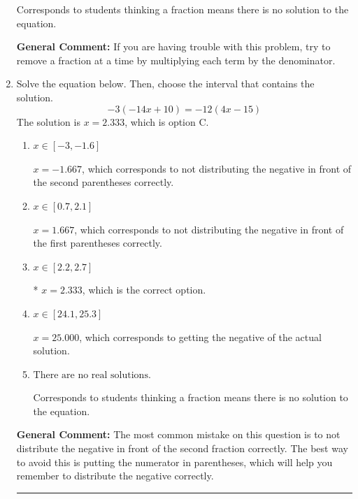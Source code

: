 \documentclass{extbook}[14pt]
\newcommand{\litem}[1]{\item #1

\rule{\textwidth}{0.4pt}}
\begin{document}
\begin{enumerate}
{\begin{enumerate}[label=\Alph*.]
Corresponds to students thinking a fraction means there is no solution to the equation.
\end{enumerate}

\textbf{General Comment:} If you are having trouble with this problem, try to remove a fraction at a time by multiplying each term by the denominator.
}
\litem{
Solve the equation below. Then, choose the interval that contains the solution.
\[ -3(-14x + 10) = -12(4x -15) \]The solution is \( x = 2.333 \), which is option C.\begin{enumerate}[label=\Alph*.]
\item \( x \in [-3, -1.6] \)

$x = -1.667$, which corresponds to not distributing the negative in front of the second parentheses correctly.
\item \( x \in [0.7, 2.1] \)

$x = 1.667$, which corresponds to not distributing the negative in front of the first parentheses correctly.
\item \( x \in [2.2, 2.7] \)

* $x = 2.333$, which is the correct option.
\item \( x \in [24.1, 25.3] \)

$x = 25.000$, which corresponds to getting the negative of the actual solution.
\item \( \text{There are no real solutions.} \)

Corresponds to students thinking a fraction means there is no solution to the equation.
\end{enumerate}

\textbf{General Comment:} The most common mistake on this question is to not distribute the negative in front of the second fraction correctly. The best way to avoid this is putting the numerator in parentheses, which will help you remember to distribute the negative correctly.
}
\end{enumerate}
\end{document}
